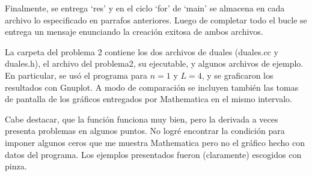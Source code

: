 \documentclass[12pt]{article}
\begin{document}
Finalmente, se entrega `res' y en el ciclo `for' de `main' se almacena en cada archivo lo especificado en parrafos anteriores. Luego de completar todo el bucle se entrega un mensaje enunciando la creación exitosa de ambos archivos.

La carpeta del problema 2 contiene los dos archivos de duales (duales.cc y duales.h), el archivo del problema2, su ejecutable, y algunos archivos de ejemplo. En particular, se usó el programa para $n=1$ y $L=4$, y se graficaron los resultados con Gnuplot. A modo de comparación se incluyen también las tomas de pantalla de los gráficos entregados por Mathematica en el mismo intervalo.

Cabe destacar, que la función funciona muy bien, pero la derivada a veces presenta problemas en algunos puntos. No logré encontrar la condición para imponer algunos ceros que me muestra Mathematica pero no el gráfico hecho con datos del programa. Los ejemplos presentados fueron (claramente) escogidos con pinza.
\end{document}
